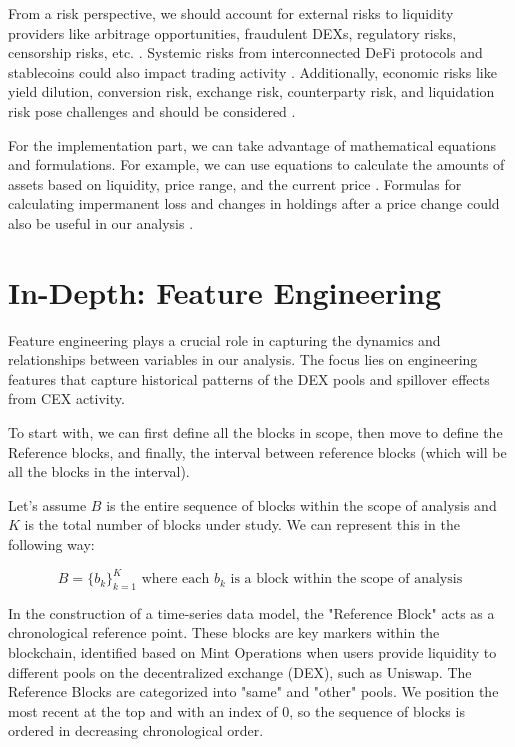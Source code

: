 \documentclass{article}
\begin{document}
From a risk perspective, we should account for external risks to liquidity providers like arbitrage opportunities, fraudulent DEXs, regulatory risks, censorship risks, etc. \cite{Aigner2021}. Systemic risks from interconnected DeFi protocols and stablecoins could also impact trading activity \cite{Makarov2022}. Additionally, economic risks like yield dilution, conversion risk, exchange risk, counterparty risk, and liquidation risk pose challenges and should be considered \cite{Xu2023}.

For the implementation part, we can take advantage of mathematical equations and formulations. For example, we can use equations to calculate the amounts of assets based on liquidity, price range, and the current price \cite{Elsts2021}. Formulas for calculating impermanent loss and changes in holdings after a price change could also be useful in our analysis \cite{Elsts2021, Aigner2021, Heimbach2022}.

\section*{\textbf{In-Depth: Feature Engineering}}

Feature engineering plays a crucial role in capturing the dynamics and relationships between variables in our analysis. The focus lies on engineering features that capture historical patterns of the DEX pools and spillover effects from CEX activity.

To start with, we can first define all the blocks in scope, then move to define the Reference blocks, and finally, the interval between reference blocks (which will be all the blocks in the interval).

Let's assume $B$ is the entire sequence of blocks within the scope of analysis and $K$ is the total number of blocks under study. We can represent this in the following way:

\begin{equation}
B = \{b_k\}_{k=1}^{K} \text{ where each } b_k \text{ is a block within the scope of analysis}
\end{equation}

In the construction of a time-series data model, the "Reference Block" acts as a chronological reference point. These blocks are key markers within the blockchain, identified based on Mint Operations when users provide liquidity to different pools on the decentralized exchange (DEX), such as Uniswap. The Reference Blocks are categorized into "same" and "other" pools. We position the most recent at the top and with an index of 0, so the sequence of blocks is ordered in decreasing chronological order.
\end{document}
